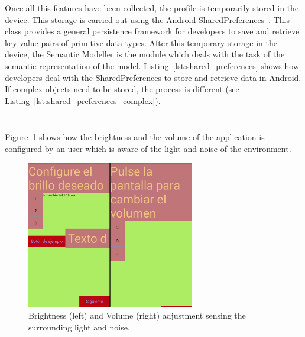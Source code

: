 Once all this features have been collected, the profile is temporarily stored in 
the device. This storage is carried out using the Android 
SharedPreferences~\citep{shared_preferences}. This class provides a general 
persistence framework for developers to save and retrieve key-value pairs of 
primitive data types. After this temporary storage in the device, the Semantic 
Modeller is the module which deals with the task of the semantic representation 
of the model. Listing~\ref{lst:shared_preferences} shows how developers deal 
with the SharedPreferences to store and retrieve data in Android. If complex
objects need to be stored, the process is different (see Listing~\ref{lst:shared_preferences_complex}).

\inputminted[linenos=true, fontsize=\footnotesize, frame=lines]{java}{4_system_architecture/shared_preferences.java}

\inputminted[linenos=true, fontsize=\footnotesize, frame=lines]{java}{4_system_architecture/shared_preferences_complex.java}

Figure~\ref{fig:context_activity} shows how the brightness and the volume of
the application is configured by an user which is aware of the light and noise
of the environment.

\begin{figure}
\centering
\includegraphics[width=0.65\textwidth]{context_activity.png}
\caption{Brightness (left) and Volume (right) adjustment sensing the surrounding
light and noise.}
\label{fig:context_activity}
\end{figure}


